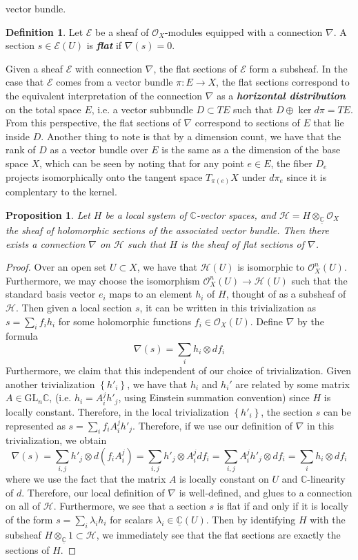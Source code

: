 \documentclass[psamsfonts, 12pt]{amsart}
\newtheorem{prop}[thm]{Proposition}
\theoremstyle{definition}
\newtheorem{defn}[thm]{Definition}
\theoremstyle{remark}
\renewcommand{\O}{\mathcal{O}}
\newcommand{\ib}[1]{\textbf{\textit{#1}}}
\newcommand{\C}{\mathbb{C}}
\newcommand{\GL}{\mathrm{GL}}
\newcommand{\set}[1]{\left\lbrace #1 \right\rbrace}
\begin{document}
vector bundle.
%
\begin{defn}
Let $\mathcal{E}$ be a sheaf of $\O_X$-modules equipped with a connection $\nabla$.
A section $s \in \mathcal{E}(U)$ is \ib{flat} if $\nabla(s) = 0$.
\end{defn}
%
Given a sheaf $\mathcal{E}$ with connection $\nabla$, the flat sections
of $\mathcal{E}$ form a subsheaf. In the case that $\mathcal{E}$ comes from a
vector bundle $\pi : E \to X$, the flat sections correspond to the equivalent
interpretation of the connection $\nabla$ as a \ib{horizontal distribution} on
the total space $E$, i.e. a vector subbundle $D \subset TE$ such that
$D \oplus \ker d\pi = TE$. From this perspective, the flat sections of $\nabla$
correspond to sections of $E$ that lie inside $D$. Another thing to note is
that by a dimension count, we have that the rank of $D$ as a vector bundle
over $E$ is the same as a the dimension of the base space $X$, which can be
seen by noting that for any point $e \in E$, the fiber $D_e$ projects isomorphically
onto the tangent space $T_{\pi(e)}X$ under $d\pi_e$ since it is complentary to the
kernel.
%
\begin{prop}
Let $H$ be a local system of $\C$-vector spaces, and
$\mathcal{H} = H \otimes_{\underline{\C}} \O_X$ the sheaf of holomorphic sections of
the associated vector bundle. Then there exists a connection $\nabla$ on $\mathcal{H}$
such that $H$ is the sheaf of flat sections of $\nabla$.
\end{prop}
%
\begin{proof}
Over an open set $U \subset X$, we have that $\mathcal{H}(U)$ is isomorphic to
$\O_X^n(U)$. Furthermore, we may choose the isomorphism $\O^n_X(U) \to \mathcal{H}(U)$
such that the standard basis vector $e_i$ maps to an element $h_i$ of $H$, thought
of as a subsheaf of $\mathcal{H}$. Then given a local section $s$, it can
be written in this trivialization as $s = \sum_i f_ih_i$ for some holomorphic
functions $f_i \in \O_X(U)$. Define $\nabla$ by the formula
\[
\nabla(s) = \sum_i h_i \otimes df_i
\]
Furthermore, we claim that this independent of our choice of trivialization. Given
another trivialization $\set{h'_i}$, we have that $h_i$ and $h_i'$ are related by
some matrix $A \in \GL_n\C$, (i.e. $h_i = A_i^jh'_j$, using Einstein summation
convention) since $H$ is locally constant. Therefore, in the
local trivialization $\set{h'_i}$, the section $s$ can be represented as
$s = \sum_if_iA^j_ih'_j$. Therefore, if we use our definition of $\nabla$
in this trivialization, we obtain
\[
\nabla(s) = \sum_{i,j} h'_j \otimes d(f_iA^j_i) = \sum_{i,j} h'_j \otimes A^j_i df_i
= \sum_{i,j} A^j_ih'_j \otimes df_i = \sum_i h_i \otimes df_i
\]
where we use the fact that the matrix $A$ is locally constant on $U$ and $\C$-linearity
of $d$. Therefore, our local definition of $\nabla$ is well-defined, and glues to a
connection on all of $\mathcal{H}$. Furthermore, we see that a section $s$ is flat if
and only if it is locally of the form $s = \sum_i \lambda_ih_i$ for scalars
$\lambda_i \in \underline{\C}(U)$. Then by identifying $H$ with the subsheaf
$H \otimes_{\underline{\C}} 1 \subset \mathcal{H}$, we immediately see that
the flat sections are exactly the sections of $H$.
\end{proof}
\end{document}
